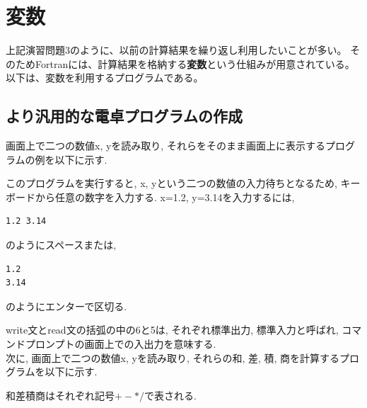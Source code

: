 \documentclass[a4j]{jsbook}
\begin{document}
\section{変数}
上記演習問題3のように、以前の計算結果を繰り返し利用したいことが多い。
そのためFortranには、計算結果を格納する{\bfseries 変数}という仕組みが用意されている。
以下は、変数を利用するプログラムである。



\subsection*{より汎用的な電卓プログラムの作成}
画面上で二つの数値x, yを読み取り, それらをそのまま画面上に表示するプログラムの例を以下に示す.

このプログラムを実行すると, x, yという二つの数値の入力待ちとなるため,
キーボードから任意の数字を入力する.
x=1.2, y=3.14を入力するには,
\begin{Verbatim}[frame=single]
1.2 3.14
\end{Verbatim}
のようにスペースまたは,
\begin{Verbatim}[frame=single]
1.2
3.14
\end{Verbatim}
のようにエンターで区切る.

write文とread文の括弧の中の6と5は,
それぞれ標準出力, 標準入力と呼ばれ, コマンドプロンプトの画面上での入出力を意味する. \\


次に, 画面上で二つの数値x, yを読み取り, それらの和, 差, 積, 商を計算するプログラムを以下に示す.

和差積商はそれぞれ記号$+-*/$で表される.
\\

\end{document}
